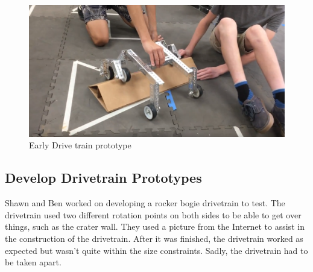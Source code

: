 \documentclass{article}
\begin{document}
\begin{figure}
    \centering
    \includegraphics[width=.6\textwidth]{02_09-10/images/Screenshot (5).png}
    \caption{Early Drive train prototype}
    \label{fig:drivetrain sketches}
\end{figure}



\subsection{Develop Drivetrain Prototypes}
Shawn and Ben worked on developing a rocker bogie drivetrain to test. The drivetrain used two different rotation points on both sides to be able to get over things, such as the crater wall. They used a picture from the Internet to assist in the construction of the drivetrain. After it was finished, the drivetrain worked as expected but wasn't quite within the size constraints. Sadly, the drivetrain had to be taken apart. 
\end{document}
